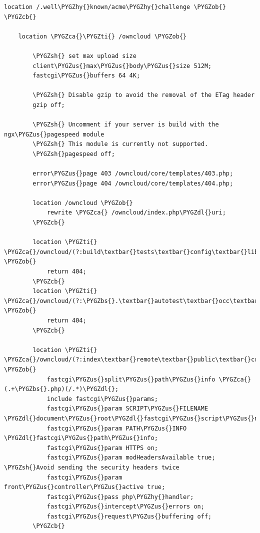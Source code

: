 \documentclass[letterpaper,10pt,english]{sphinxmanual}
\def\PYGZbs{\char`\\}
\def\PYGZus{\char`\_}
\def\PYGZob{\char`\{}
\def\PYGZcb{\char`\}}
\def\PYGZca{\char`\^}
\def\PYGZsh{\char`\#}
\def\PYGZdl{\char`\$}
\def\PYGZhy{\char`\-}
\def\PYGZti{\char`\~}
\begin{document}
\begin{Verbatim}[commandchars=\\\{\}]
    location /.well\PYGZhy{}known/acme\PYGZhy{}challenge \PYGZob{} \PYGZcb{}

    location \PYGZca{}\PYGZti{} /owncloud \PYGZob{}

        \PYGZsh{} set max upload size
        client\PYGZus{}max\PYGZus{}body\PYGZus{}size 512M;
        fastcgi\PYGZus{}buffers 64 4K;

        \PYGZsh{} Disable gzip to avoid the removal of the ETag header
        gzip off;

        \PYGZsh{} Uncomment if your server is build with the ngx\PYGZus{}pagespeed module
        \PYGZsh{} This module is currently not supported.
        \PYGZsh{}pagespeed off;

        error\PYGZus{}page 403 /owncloud/core/templates/403.php;
        error\PYGZus{}page 404 /owncloud/core/templates/404.php;

        location /owncloud \PYGZob{}
            rewrite \PYGZca{} /owncloud/index.php\PYGZdl{}uri;
        \PYGZcb{}

        location \PYGZti{} \PYGZca{}/owncloud/(?:build\textbar{}tests\textbar{}config\textbar{}lib\textbar{}3rdparty\textbar{}templates\textbar{}data)/ \PYGZob{}
            return 404;
        \PYGZcb{}
        location \PYGZti{} \PYGZca{}/owncloud/(?:\PYGZbs{}.\textbar{}autotest\textbar{}occ\textbar{}issue\textbar{}indie\textbar{}db\PYGZus{}\textbar{}console) \PYGZob{}
            return 404;
        \PYGZcb{}

        location \PYGZti{} \PYGZca{}/owncloud/(?:index\textbar{}remote\textbar{}public\textbar{}cron\textbar{}core/ajax/update\textbar{}status\textbar{}ocs/v[12]\textbar{}updater/.+\textbar{}ocs\PYGZhy{}provider/.+\textbar{}core/templates/40[34])\PYGZbs{}.php(?:\PYGZdl{}\textbar{}/) \PYGZob{}
            fastcgi\PYGZus{}split\PYGZus{}path\PYGZus{}info \PYGZca{}(.+\PYGZbs{}.php)(/.*)\PYGZdl{};
            include fastcgi\PYGZus{}params;
            fastcgi\PYGZus{}param SCRIPT\PYGZus{}FILENAME \PYGZdl{}document\PYGZus{}root\PYGZdl{}fastcgi\PYGZus{}script\PYGZus{}name;
            fastcgi\PYGZus{}param PATH\PYGZus{}INFO \PYGZdl{}fastcgi\PYGZus{}path\PYGZus{}info;
            fastcgi\PYGZus{}param HTTPS on;
            fastcgi\PYGZus{}param modHeadersAvailable true; \PYGZsh{}Avoid sending the security headers twice
            fastcgi\PYGZus{}param front\PYGZus{}controller\PYGZus{}active true;
            fastcgi\PYGZus{}pass php\PYGZhy{}handler;
            fastcgi\PYGZus{}intercept\PYGZus{}errors on;
            fastcgi\PYGZus{}request\PYGZus{}buffering off;
        \PYGZcb{}


\end{Verbatim}
\end{document}
